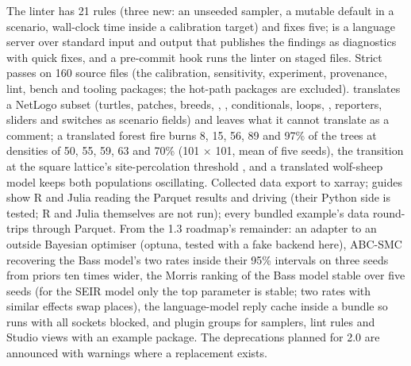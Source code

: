 The linter has 21 rules (three new: an unseeded sampler, a mutable default in a scenario,
wall-clock time inside a calibration target) and fixes five;  is a
language server over standard input and output that publishes the findings as diagnostics
with quick fixes, and a pre-commit hook runs the linter on staged files. Strict 
passes on 160 source files (the calibration, sensitivity, experiment, provenance, lint,
bench and tooling packages; the hot-path packages are excluded). 
translates a NetLogo subset (turtles, patches, breeds, , , conditionals,
loops, , reporters, sliders and switches as scenario fields) and leaves what it
cannot translate as a comment; a translated forest fire burns 8, 15, 56, 89 and 97\% of the
trees at densities of 50, 55, 59, 63 and 70\% (101 $\times$ 101, mean of five seeds), the
transition at the square lattice's site-percolation threshold \citep{newman2000efficient},
and a translated wolf-sheep model keeps both populations oscillating. Collected data export to
xarray; guides show R and Julia reading the Parquet results and driving \modelly{} (their
Python side is tested; R and Julia themselves are not run); every bundled example's data
round-trips through Parquet. From the 1.3 roadmap's remainder: an adapter to an outside
Bayesian optimiser (optuna, tested with a fake backend here), ABC-SMC recovering the Bass
model's two rates inside their 95\% intervals on three seeds from priors ten times wider, the
Morris ranking of the Bass model stable over five seeds (for the SEIR model only the top
parameter is stable; two rates with similar effects swap places), the language-model reply
cache inside a bundle so  runs with all sockets blocked, and plugin groups
for samplers, lint rules and Studio views with an example package. The deprecations planned
for 2.0 are announced with warnings where a replacement exists.

